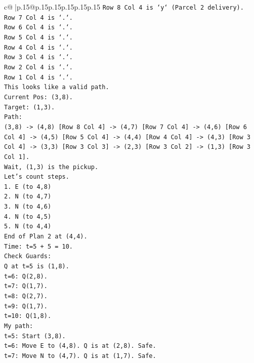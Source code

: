 \documentclass{article}
\begin{document}
{\begin{supertabular}{c@{$\;$}|p{.15\linewidth}@{}p{.15\linewidth}p{.15\linewidth}p{.15\linewidth}p{.15\linewidth}p{.15\linewidth}}
{{{\texttt{Row 8 Col 4 is `y` (Parcel 2 delivery).} \\
\texttt{Row 7 Col 4 is `.`.} \\
\texttt{Row 6 Col 4 is `.`.} \\
\texttt{Row 5 Col 4 is `.`.} \\
\texttt{Row 4 Col 4 is `.`.} \\
\texttt{Row 3 Col 4 is `.`.} \\
\texttt{Row 2 Col 4 is `.`.} \\
\texttt{Row 1 Col 4 is `.`.} \\
\texttt{This looks like a valid path.} \\
\texttt{Current Pos: (3,8).} \\
\texttt{Target: (1,3).} \\
\texttt{Path:} \\
\texttt{(3,8) {-}> (4,8) {[}Row 8 Col 4{]} {-}> (4,7) {[}Row 7 Col 4{]} {-}> (4,6) {[}Row 6 Col 4{]} {-}> (4,5) {[}Row 5 Col 4{]} {-}> (4,4) {[}Row 4 Col 4{]} {-}> (4,3) {[}Row 3 Col 4{]} {-}> (3,3) {[}Row 3 Col 3{]} {-}> (2,3) {[}Row 3 Col 2{]} {-}> (1,3) {[}Row 3 Col 1{]}.} \\
\texttt{Wait, (1,3) is the pickup.} \\
\texttt{Let's count steps.} \\
\texttt{1. E (to 4,8)} \\
\texttt{2. N (to 4,7)} \\
\texttt{3. N (to 4,6)} \\
\texttt{4. N (to 4,5)} \\
\texttt{5. N (to 4,4)} \\
\texttt{End of Plan 2 at (4,4).} \\
\texttt{Time: t=5 + 5 = 10.} \\
\texttt{Check Guards:} \\
\texttt{Q at t=5 is (1,8).} \\
\texttt{t=6: Q(2,8).} \\
\texttt{t=7: Q(1,7).} \\
\texttt{t=8: Q(2,7).} \\
\texttt{t=9: Q(1,7).} \\
\texttt{t=10: Q(1,8).} \\
\texttt{My path:} \\
\texttt{t=5: Start (3,8).} \\
\texttt{t=6: Move E to (4,8). Q is at (2,8). Safe.} \\
\texttt{t=7: Move N to (4,7). Q is at (1,7). Safe.} \\
}}}
\end{supertabular}}
\end{document}

